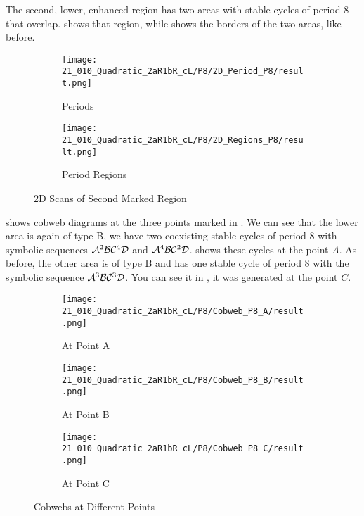 The second, lower, enhanced region has two areas with stable cycles of period 8 that overlap.
 shows that region, while  shows the borders of the two areas, like before.

\begin{figure}
    \centering
    \begin{subfigure}{0.4\textwidth}
        \centering
        \texttt{[image: 21\_010\_Quadratic\_2aR1bR\_cL/P8/2D\_Period\_P8/result.png]}
        \caption{Periods}
        \label{fig:quadratic.full.2aR1bR_cL.2d.2}
    \end{subfigure}
    \begin{subfigure}{0.4\textwidth}
        \centering
        \texttt{[image: 21\_010\_Quadratic\_2aR1bR\_cL/P8/2D\_Regions\_P8/result.png]}
        \caption{Period Regions}
        \label{fig:quadratic.regions.2aR1bR_cL.2d.2}
    \end{subfigure}
    \caption{2D Scans of Second Marked Region}
\end{figure}

 shows cobweb diagrams at the three points marked in .
We can see that the lower area is again of type B, we have two coexisting stable cycles of period 8 with symbolic sequences $\mathcal{A}^2\mathcal{B}\mathcal{C}^4\mathcal{D}$ and $\mathcal{A}^4\mathcal{B}\mathcal{C}^2\mathcal{D}$.
 shows these cycles at the point $A$.
As before, the other area is of type B and has one stable cycle of period 8 with the symbolic sequence $\mathcal{A}^3\mathcal{B}\mathcal{C}^3\mathcal{D}$.
You can see it in , it was generated at the point $C$.

\begin{figure}
    \centering
    \begin{subfigure}{0.3\textwidth}
        \centering
        \texttt{[image: 21\_010\_Quadratic\_2aR1bR\_cL/P8/Cobweb\_P8\_A/result.png]}
        \caption{At Point A}
        \label{fig:quad.full.2aR1bR_cL.2.CobwebA}
    \end{subfigure}
    \begin{subfigure}{0.3\textwidth}
        \centering
        \texttt{[image: 21\_010\_Quadratic\_2aR1bR\_cL/P8/Cobweb\_P8\_B/result.png]}
        \caption{At Point B}
        \label{fig:quad.full.2aR1bR_cL.2.CobwebB}
    \end{subfigure}
    \begin{subfigure}{0.3\textwidth}
        \centering
        \texttt{[image: 21\_010\_Quadratic\_2aR1bR\_cL/P8/Cobweb\_P8\_C/result.png]}
        \caption{At Point C}
        \label{fig:quad.full.2aR1bR_cL.2.CobwebC}
    \end{subfigure}
    \caption{Cobwebs at Different Points}
    \label{fig:quad.full.2aR1bR_cL.2.Cobwebs}
\end{figure}

